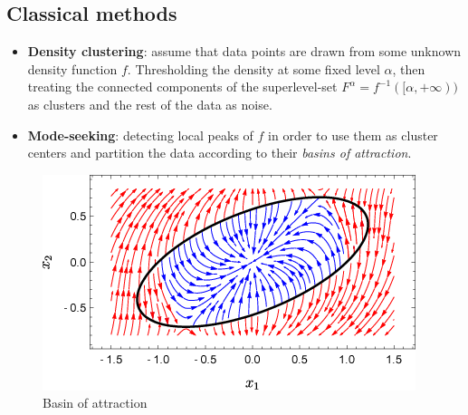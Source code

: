 \documentclass{beamer}
\theoremstyle{definition}
\begin{document}
\subsection{Classical methods}
\begin{frame}
\begin{itemize}
\frametitle{}
\item \textbf{Density clustering}: assume that data points are drawn from
some unknown density function $f$. Thresholding the density at some fixed level $\alpha$, then treating the connected components
of the superlevel-set $F^{\alpha} = f^{-1}([\alpha,+\infty))$ as clusters and the rest of the data as noise. %
\item \textbf{Mode-seeking}: detecting local peaks of $f$ in order to use them as cluster centers and partition the data according to their
\emph{basins of attraction}. %
\end{itemize}
\end{frame}

\begin{frame}
\begin{figure}
\includegraphics[scale=0.5]{basin}
\caption{Basin of attraction}
\end{figure}
\end{frame}
\end{document}
